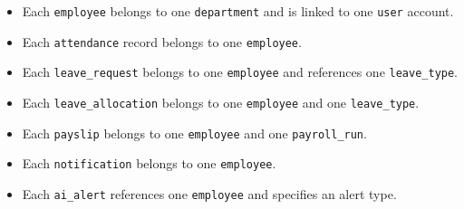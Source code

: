 \documentclass[12pt,a4paper]{report}
\begin{document}
\begin{itemize}
    \item Each \texttt{employee} belongs to one \texttt{department} and is linked to one \texttt{user} account.
    \item Each \texttt{attendance} record belongs to one \texttt{employee}.
    \item Each \texttt{leave\_request} belongs to one \texttt{employee} and references one \texttt{leave\_type}.
    \item Each \texttt{leave\_allocation} belongs to one \texttt{employee} and one \texttt{leave\_type}.
    \item Each \texttt{payslip} belongs to one \texttt{employee} and one \texttt{payroll\_run}.
    \item Each \texttt{notification} belongs to one \texttt{employee}.
    \item Each \texttt{ai\_alert} references one \texttt{employee} and specifies an alert type.
\end{itemize}
\end{document}
